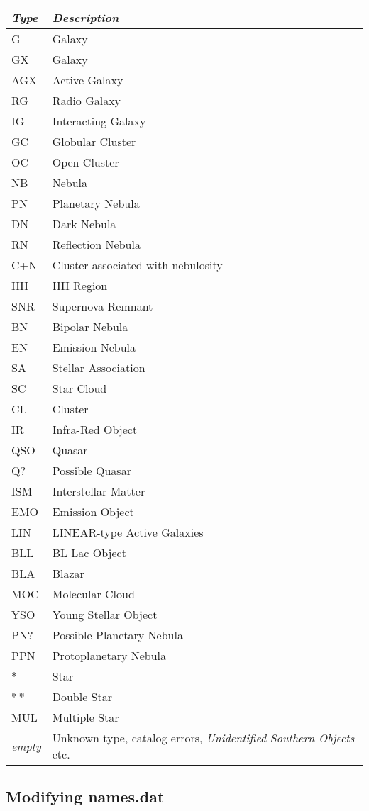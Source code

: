 \begin{longtabu} to \textwidth {l|X}
\toprule
\emph{Type} & \emph{Description}\\\midrule
G   & Galaxy\\
GX  & Galaxy\\
AGX & Active Galaxy\\
RG  & Radio Galaxy\\
IG  & Interacting Galaxy\\
GC  & Globular Cluster\\
OC  & Open Cluster\\
NB  & Nebula\\
PN  & Planetary Nebula\\
DN  & Dark Nebula\\
RN  & Reflection Nebula\\
C+N & Cluster associated with nebulosity\\
HII & HII Region\\
SNR & Supernova Remnant\\
BN  & Bipolar Nebula\\
EN  & Emission Nebula\\
SA  & Stellar Association\\
SC  & Star Cloud\\
CL  & Cluster\\
IR  & Infra-Red Object\\
QSO & Quasar\\
Q?  & Possible Quasar\\
ISM & Interstellar Matter\\
EMO & Emission Object\\
LIN & LINEAR-type Active Galaxies\\
BLL & BL Lac Object\\
BLA & Blazar\\
MOC & Molecular Cloud\\
YSO & Young Stellar Object\\
PN? & Possible Planetary Nebula\\
PPN & Protoplanetary Nebula\\
$\ast$ & Star\\
$\ast\ast$ & Double Star\\
MUL & Multiple Star\\
\emph{empty} & Unknown type, catalog errors, \emph{Unidentified Southern Objects} etc.\\
\bottomrule
\end{longtabu}

\subsection{Modifying names.dat}%
\label{sec:dso:modifyingNamesDat}

